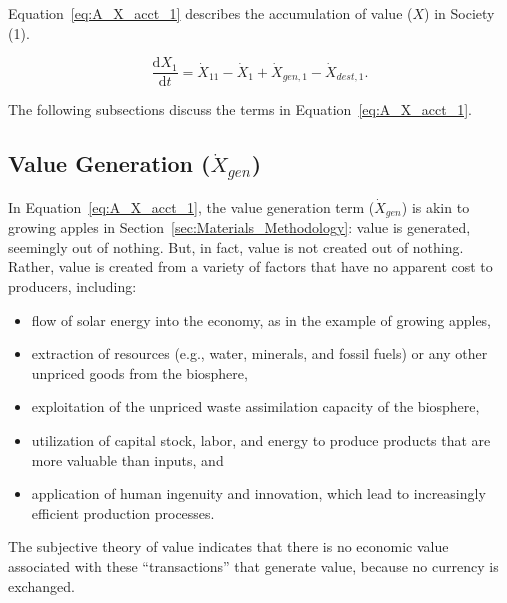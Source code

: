 Equation~\ref{eq:A_X_acct_1} describes the accumulation 
of value
($X$) in Society (1).

\begin{equation} \label{eq:A_X_acct_1}
	\frac{\mathrm{d}X_{1}}{\mathrm{d}t} 
	= \dot{X}_{11} 
	- \dot{X}_{1}
	+ \dot{X}_{gen,1}
	- \dot{X}_{dest,1}.
\end{equation}

\noindent{} The following subsections discuss the terms in Equation~\ref{eq:A_X_acct_1}.


\subsection{Value Generation ($\dot{X}_{gen}$)}

\noindent In Equation~\ref{eq:A_X_acct_1}, 
the value generation term ($\dot{X}_{gen}$) is akin to growing apples
in Section~\ref{sec:Materials_Methodology}: 
value is generated, seemingly out of nothing.
But, in fact, value is not created out of nothing. 
Rather, value is created from a variety of factors that have no apparent cost
to producers, including:

\begin{itemize}
	\item{flow of solar energy
	into the economy,
	as in the example of growing apples,}
	\item{extraction of resources (e.g., water, minerals, and
	fossil fuels) or any other unpriced goods from the biosphere,}
	\item{exploitation of the unpriced waste assimilation capacity of the biosphere,}
	\item{utilization of capital stock, labor, and energy to produce products
	that are more valuable than inputs, and}
	\item{application of human ingenuity 
	and innovation, 
	which lead to increasingly efficient production processes.}
\end{itemize}

\noindent{}The subjective theory of value indicates that 
there is no economic value associated with these ``transactions''
that generate value, because no currency is exchanged. 

